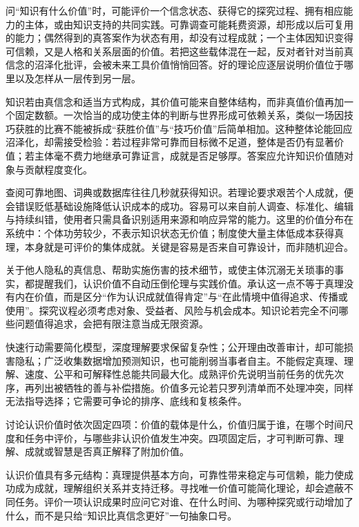 问“知识有什么价值”时，可能评价一个信念状态、获得它的探究过程、拥有相应能力的主体，或由知识支持的共同实践。可靠调查可能耗费资源，却形成以后可复用的能力；偶然得到的真答案作为状态有用，却没有过程成就；一个主体因知识变得可信赖，又是人格和关系层面的价值。若把这些载体混在一起，反对者针对当前真信念的沼泽化批评，会被未来工具价值悄悄回答。好的理论应逐层说明价值位于哪里以及怎样从一层传到另一层。

知识若由真信念和适当方式构成，其价值可能来自整体结构，而非真值价值再加一个固定数额。一次恰当的成功使主体的判断与世界形成可依赖关系，类似一场因技巧获胜的比赛不能被拆成“获胜价值”与“技巧价值”后简单相加。这种整体论能回应沼泽化，却需接受检验：若过程非常可靠而目标微不足道，整体是否仍有显著价值；若主体毫不费力地继承可靠证言，成就是否足够厚。答案应允许知识价值随对象与贡献程度变化。

查阅可靠地图、词典或数据库往往几秒就获得知识。若理论要求艰苦个人成就，便会错误贬低基础设施降低认识成本的成功。容易可以来自前人调查、标准化、编辑与持续纠错，使用者只需具备识别适用来源和响应异常的能力。这里的价值分布在系统中：个体功劳较少，不表示知识状态无价值；制度使大量主体低成本获得真理，本身就是可评价的集体成就。关键是容易是否来自可靠设计，而非随机迎合。

关于他人隐私的真信息、帮助实施伤害的技术细节，或使主体沉溺无关琐事的事实，都提醒我们，认识价值不自动压倒伦理与实践价值。承认这一点不等于真理没有内在价值，而是区分“作为认识成就值得肯定”与“在此情境中值得追求、传播或使用”。探究议程必须考虑对象、受益者、风险与机会成本。知识论若完全不问哪些问题值得追求，会把有限注意当成无限资源。

快速行动需要简化模型，深度理解要求保留复杂性；公开理由改善审计，却可能损害隐私；广泛收集数据增加预测知识，也可能削弱当事者自主。不能假定真理、理解、速度、公平和可解释性总能共同最大化。成熟评价先说明当前任务的优先次序，再列出被牺牲的善与补偿措施。价值多元论若只罗列清单而不处理冲突，同样无法指导选择；它需要可争论的排序、底线和复核条件。

\begin{argumentbox}
讨论认识价值时依次固定四项：价值的载体是什么，价值归属于谁，在哪个时间尺度和任务中评价，与哪些非认识价值发生冲突。四项固定后，才可判断可靠、理解、成就或智慧是否真正解释了附加价值。
\end{argumentbox}

认识价值具有多元结构：真理提供基本方向，可靠性带来稳定与可信赖，能力使成功成为成就，理解组织关系并支持迁移。寻找唯一价值可能简化理论，却会遮蔽不同任务。评价一项认识成果时应问它对谁、在什么时间、为哪种探究或行动增加了什么，而不是只给“知识比真信念更好”一句抽象口号。
